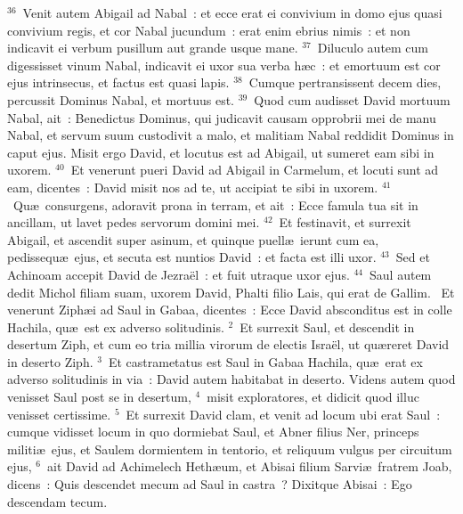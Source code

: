 ${}^{36}$~Venit autem Abigail ad Nabal~: et ecce erat ei convivium in domo ejus quasi convivium regis, et cor Nabal jucundum~: erat enim ebrius nimis~: et non indicavit ei verbum pusillum aut grande usque mane.
${}^{37}$~Diluculo autem cum digessisset vinum Nabal, indicavit ei uxor sua verba h\ae c~: et emortuum est cor ejus intrinsecus, et factus est quasi lapis.
${}^{38}$~Cumque pertransissent decem dies, percussit Dominus Nabal, et mortuus est.
${}^{39}$~Quod cum audisset David mortuum Nabal, ait~: Benedictus Dominus, qui judicavit causam opprobrii mei de manu Nabal, et servum suum custodivit a malo, et malitiam Nabal reddidit Dominus in caput ejus. Misit ergo David, et locutus est ad Abigail, ut sumeret eam sibi in uxorem.
${}^{40}$~Et venerunt pueri David ad Abigail in Carmelum, et locuti sunt ad eam, dicentes~: David misit nos ad te, ut accipiat te sibi in uxorem.
${}^{41}$~Qu\ae\ consurgens, adoravit prona in terram, et ait~: Ecce famula tua sit in ancillam, ut lavet pedes servorum domini mei.
${}^{42}$~Et festinavit, et surrexit Abigail, et ascendit super asinum, et quinque puell\ae\ ierunt cum ea, pedissequ\ae\ ejus, et secuta est nuntios David~: et facta est illi uxor.
${}^{43}$~Sed et Achinoam accepit David de Jezra\"el~: et fuit utraque uxor ejus.
${}^{44}$~Saul autem dedit Michol filiam suam, uxorem David, Phalti filio Lais, qui erat de Gallim.
~\lettrine[lines=10,image=true,loversize=0.05,lraise=-0.03]{E}{}t venerunt Ziph\ae i ad Saul in Gabaa, dicentes~: Ecce David absconditus est in colle Hachila, qu\ae\ est ex adverso solitudinis.
${}^{2}$~Et surrexit Saul, et descendit in desertum Ziph, et cum eo tria millia virorum de electis Isra\"el, ut qu\ae reret David in deserto Ziph.
${}^{3}$~Et castrametatus est Saul in Gabaa Hachila, qu\ae\ erat ex adverso solitudinis in via~: David autem habitabat in deserto. Videns autem quod venisset Saul post se in desertum,
${}^{4}$~misit exploratores, et didicit quod illuc venisset certissime.
${}^{5}$~Et surrexit David clam, et venit ad locum ubi erat Saul~: cumque vidisset locum in quo dormiebat Saul, et Abner filius Ner, princeps militi\ae\ ejus, et Saulem dormientem in tentorio, et reliquum vulgus per circuitum ejus,
${}^{6}$~ait David ad Achimelech Heth\ae um, et Abisai filium Sarvi\ae\ fratrem Joab, dicens~: Quis descendet mecum ad Saul in castra~? Dixitque Abisai~: Ego descendam tecum.


